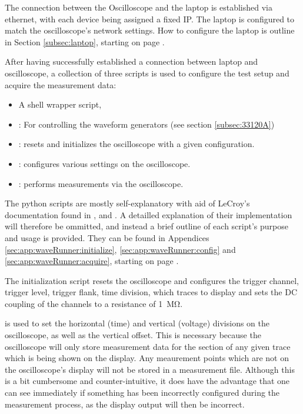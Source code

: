 The  connection  between  the  Oscilloscope  and  the  laptop  is  established
via  ethernet, with  each  device being  assigned a  fixed  IP. The laptop  is
configured  to match  the  oscilloscope's network  settings. How to  configure
the  laptop  is  outline  in Section  \ref{subsec:laptop},  starting  on  page
\pageref{subsec:laptop}.


After  having  successfully  established   a  connection  between  laptop  and
oscilloscope, a  collection of  three scripts  is used  to configure  the test
setup and acquire the measurement data:

\begin{itemize}\tightlist
    \item 
        A shell wrapper script, 
    \item
        : For controlling the waveform generators (see section
        \ref{subsec:33120A})
    \item 
        : resets and initializes the oscilloscope with
        a given configuration.
    \item 
        :   configures  various   settings  on   the
        oscilloscope.
    \item 
        :   performs   measurements   via   the
        oscilloscope.
\end{itemize}


The  python  scripts   are  mostly  self-explanatory  with   aid  of  LeCroy's
documentation   found  in   \cite{ref:WR:opMan},  \cite{ref:WR:gettingStarted}
and    \cite{ref:WR:remoteControl}. A   detailled    explanation   of    their
implementation   will   therefore   be   ommitted,   and   instead   a   brief
outline   of   each   script's   purpose  and   usage   is   provided.    They
can    be    found    in    Appendices    \ref{sec:app:waveRunner:initialize},
\ref{sec:app:waveRunner:config} and \ref{sec:app:waveRunner:acquire}, starting
on page \pageref{sec:app:waveRunner:initialize}.

The initialization script  resets the oscilloscope and  configures the trigger
channel, trigger level, trigger flank,  time division, which traces to display
and sets the DC coupling of the channels to a resistance of \SI{1}{\mega\ohm}.

 is used  to set the horizontal  (time) and vertical
(voltage) divisions on the oscilloscope,  as well as the vertical offset. This
is necessary because the oscilloscope will only store measurement data for the
section of any given trace which is being shown on the display. Any meaurement
points which  are not on  the oscilloscope's display will  not be stored  in a
measurement file. Although this is a  bit cumbersome and counter-intuitive, it
does have  the advantage that  one can see  immediately if something  has been
incorrectly configured during  the measurement process, as  the display output
will then be incorrect.

